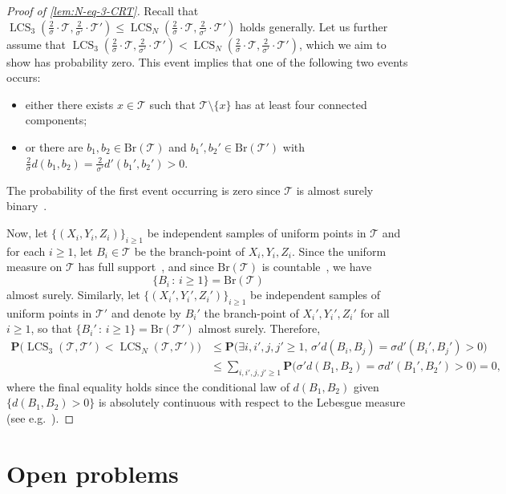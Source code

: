 \documentclass[11pt,reqno]{amsart}
\renewcommand{\P}{\mathbf{P}}
\newcommand{\1}{\mathbf{1}}
\newcommand{\0}{\mathbf{0}}
\newcommand{\sT}{\mathscr{T}}
\newcommand{\LCS}{\operatorname{LCS}}
\begin{document}
\begin{proof}[Proof of \cref{lem:N-eq-3-CRT}]
Recall that $\LCS_3(\frac{2}{\sigma}\cdot\sT,\frac{2}{\sigma'}\cdot\sT')\leq  \LCS_N(\frac{2}{\sigma}\cdot\sT,\frac{2}{\sigma'}\cdot\sT')$ holds generally. Let us further assume that $\LCS_3(\frac{2}{\sigma}\cdot\sT,\frac{2}{\sigma'}\cdot\sT')<\LCS_N(\frac{2}{\sigma}\cdot\sT,\frac{2}{\sigma'}\cdot\sT')$, which we aim to show has probability zero. This event implies that one of the following two events occurs:
\begin{itemize}
    \item either there exists $x\in \sT$ such that $\sT\setminus \{x\}$ has at least four connected components;
    \item or there are $b_1,b_2\in \mathrm{Br}(\sT)$ and $b_1',b_2'\in\mathrm{Br}(\sT')$ with $\frac{2}{\sigma}d(b_1,b_2)=\frac{2}{\sigma'}d'(b_1',b_2')>0$.
\end{itemize}
The probability of the first event occurring is zero since $\sT$ is almost surely binary~\cite{aldous1991continuumI}. 

Now, let $\{(X_i,Y_i,Z_i)\}_{i\geq 1}$ be independent samples of uniform points in $\sT$ and for each $i \geq 1$, let $B_i \in \sT$ be the branch-point of $X_i,Y_i,Z_i$. Since the uniform measure on $\sT$ has full support~\cite{aldous1991continuumI}, and since $\mathrm{Br}(\sT)$ is countable~\cite[Lemma 3.1]{duquesne2007growth}, we have 
\[\{ B_i\, :\, i\geq 1 \}=\mathrm{Br}(\sT)\]
almost surely. Similarly, let $\{(X_i',Y_i',Z_i')\}_{i\geq 1}$ be independent samples of uniform points in $\sT'$ and denote by $B_i'$ the branch-point of $X_i',Y_i',Z_i'$ for all $i\geq 1$, so that $\{B_i'\, :\, i\geq 1\}=\mathrm{Br}(\sT')$ almost surely. Therefore,
\begin{align*}
\P\big(\LCS_3(\sT,\sT')<\LCS_N(\sT,\sT')\big)&\leq \P\big(\exists i,i',j,j'\geq 1,\, \sigma' d(B_i,B_j)=\sigma d'(B_i',B_j')>0\big)\\
&\leq \sum_{i,i',j,j'\geq 1}\P\big(\sigma 'd(B_1,B_2)=\sigma d'(B_1',B_2')>0\big)=0,
\end{align*}
where the final equality holds since the conditional law of $d(B_1,B_2)$ given $\{d(B_1,B_2)>0\}$ is absolutely continuous with respect to the Lebesgue measure (see e.g.\ \cite[Lemma 21]{aldous1993continuumIII}).
\end{proof}


\section{Open problems}
\label{sec:open-problems}
\end{document}
